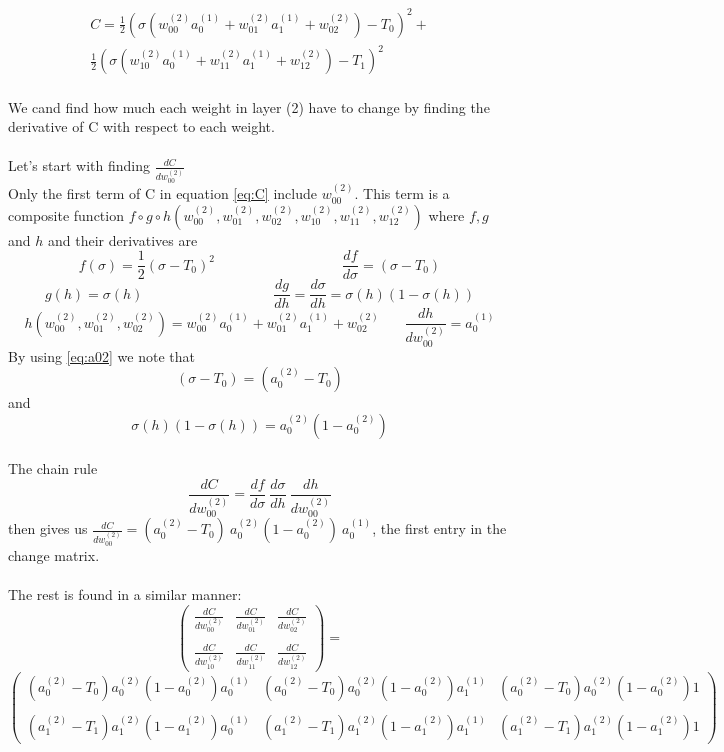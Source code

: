 \documentclass{article}
\begin{document}
\begin{equation} \label{eq:C} 
\begin{aligned}
C = \frac {1}{2}(\sigma(w_{00}^{(2)}a_0^{(1)}+w_{01}^{(2)}a_1^{(1)}+w_{02}^{(2)})-T_0)^2 + 
\\
\frac {1}{2}(\sigma(w_{10}^{(2)}a_0^{(1)}+w_{11}^{(2)}a_1^{(1)}+w_{12}^{(2)})-T_1)^2
\end{aligned}
\end{equation}
\\
We cand find how much each weight in layer (2) have to change by finding the derivative of C with respect to each weight.
\\
\\Let's start with finding $\frac{dC}{dw_{00}^{(2)}}$
\\
Only the first term of C in equation \eqref{eq:C} include $w_{00}^{(2)}$. This term is a composite function $f \circ g \circ h(w_{00}^{(2)}, w_{01}^{(2)}, w_{02}^{(2)}, w_{10}^{(2)}, w_{11}^{(2)},w_{12}^{(2)})$ where $f, g$ and $h$ and their derivatives are
$$f(\sigma) = \frac {1}{2}(\sigma-T_0)^2~~~~~~~~~~~~~~~~~~~~~~~~~~~~~~~~~~~~~~~~~\frac{df}{d\sigma} = (\sigma-T_0)$$
$$g(h) = \sigma(h)~~~~~~~~~~~~~~~~~~~~~~~~~~~~~~~~~~~~~~~~~~\frac{dg}{dh} = \frac{d\sigma}{dh} = \sigma(h)(1 - \sigma(h))$$ 
$$h(w_{00}^{(2)}, w_{01}^{(2)}, w_{02}^{(2)}) = w_{00}^{(2)}a_0^{(1)}+w_{01}^{(2)}a_1^{(1)}+w_{02}^{(2)}~~~~~~~~\frac{dh}{dw_{00}^{(2)}} = a_0^{(1)}$$
By using  \eqref{eq:a02} we note that $$(\sigma - T_0) = (a_0^{(2)} - T_0)$$ and $$\sigma(h)(1-\sigma(h)) =a_0^{(2)}(1-a_0^{(2)})$$ 
\\ The chain rule $$\frac{dC}{dw_{00}^{(2)}} = \frac{df}{d\sigma}~\frac{d\sigma}{dh}~\frac{dh}{dw_{00}^{(2)}}$$ 
then gives us
$\frac{dC}{dw_{00}^{(2)}} = (a_0^{(2)}-T_0)~a_0^{(2)}(1-a_0^{(2)})~a_0^{(1)} $, the first entry in the change matrix.
\\\\
The rest is found in a similar manner:
$$\begin{pmatrix}
\frac{dC}{dw_{00}^{(2)}} & \frac{dC}{dw_{01}^{(2)}} & \frac{dC}{dw_{02}^{(2)}}
\\\\
\frac{dC}{dw_{10}^{(2)}} & \frac{dC}{dw_{11}^{(2)}} & \frac{dC}{dw_{12}^{(2)}} 
\end{pmatrix} =
$$
$$\begin{pmatrix}
(a_0^{(2)}-T_0)a_0^{(2)}(1-a_0^{(2)})a_0^{(1)} & (a_0^{(2)}-T_0)a_0^{(2)}(1-a_0^{(2)})a_1^{(1)} & (a_0^{(2)}-T_0)a_0^{(2)}(1-a_0^{(2)})1
\\\\
(a_1^{(2)}-T_1)a_1^{(2)}(1-a_1^{(2)})a_0^{(1)} & (a_1^{(2)}-T_1)a_1^{(2)}(1-a_1^{(2)})a_1^{(1)} & (a_1^{(2)}-T_1)a_1^{(2)}(1-a_1^{(2)})1
\end{pmatrix}$$
\end{document}
